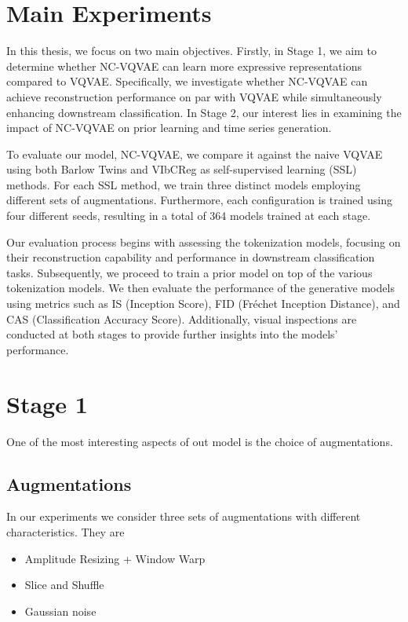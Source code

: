 \documentclass[../../thesis.tex]{subfiles}
\begin{document}
\section{Main Experiments}

In this thesis, we focus on two main objectives. Firstly, in Stage 1, we aim to determine whether NC-VQVAE can learn more expressive representations compared to VQVAE. Specifically, we investigate whether NC-VQVAE can achieve reconstruction performance on par with VQVAE while simultaneously enhancing downstream classification. In Stage 2, our interest lies in examining the impact of NC-VQVAE on prior learning and time series generation.\newline

To evaluate our model, NC-VQVAE, we compare it against the naive VQVAE using both Barlow Twins and VIbCReg as self-supervised learning (SSL) methods. For each SSL method, we train three distinct models employing different sets of augmentations. Furthermore, each configuration is trained using four different seeds, resulting in a total of 364 models trained at each stage.\newline

Our evaluation process begins with assessing the tokenization models, focusing on their reconstruction capability and performance in downstream classification tasks. Subsequently, we proceed to train a prior model on top of the various tokenization models. We then evaluate the performance of the generative models using metrics such as IS (Inception Score), FID (Fréchet Inception Distance), and CAS (Classification Accuracy Score). Additionally, visual inspections are conducted at both stages to provide further insights into the models' performance.\newline


\section{Stage 1}

One of the most interesting aspects of out model is the choice of augmentations. 

\subsection{Augmentations}
In our experiments we consider three sets of augmentations with different characteristics. They are
\begin{itemize}
    \item Amplitude Resizing + Window Warp
    \item Slice and Shuffle
    \item Gaussian noise
\end{itemize}
\end{document}
